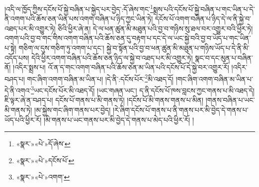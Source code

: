 །འདི་ལ་ཁྱོད་ཀྱིས་དངོས་པོ་སྐྱེ་བཞིན་པ་སྐྱེད་པར་བྱེད་:དོ་ཞེས་གང་\footnote{«སྣར་»«པེ་»དོ་ཞེས་}སྨྲས་པའི་དངོས་པོ་སྐྱེ་བཞིན་པ་གང་ཡིན་པ་དེ་ནི་འགག་པའི་ཆོས་ཅན་ཡིན་པས་འགག་བཞིན་པ་ཉིད་ཀྱང་ཡིན་ཏེ། དངོས་པོ་འགག་བཞིན་པ་ཉིད་དེ་ལ་ནི་སྐྱེ་བ་འཐད་པར་མི་འགྱུར་ཏེ། ཅིའི་ཕྱིར་ཞེ་ན། དེ་ལ་ཕན་ཚུན་མི་མཐུན་པའི་བྱ་བ་གཉིས་སུ་ཐལ་བར་འགྱུར་བའི་ཕྱིར་ཏེ། འགག་པའི་བྱ་བ་གང་གིས་འགག་བཞིན་པའི་ཆོས་ཅན་དུ་བརྟག་པ་དང་དེ་ལ་ཡང་སྐྱེ་བའི་བྱ་བ་ཡོད་པ་གང་ཡིན་པ་སྟེ། གཅིག་ལ་དུས་གཅིག་ཏུ་འགག་པ་དང་། སྐྱེ་བ་སྟོན་པའི་བྱ་བ་ཕན་ཚུན་མི་མཐུན་པ་གཉིས་ཡོད་པ་དེ་ནི་མི་འདོད་པས། དེའི་ཕྱིར་འགག་བཞིན་པའི་ཆོས་ཅན་ཉིད་ལ་སྐྱེ་བ་འཐད་པར་མི་འགྱུར་ཏེ། སྣང་བ་དང་མུན་པ་བཞིན་ནོ། །འདིར་སྨྲས་པ། འོ་ན་ད་གང་འགག་བཞིན་པའི་ཆོས་ཅན་མ་ཡིན་པའི་དངོས་པོ་དེ་སྐྱེ་བར་འགྱུར་རོ། །འདིར་བཤད་པ། གང་ཞིག་འགག་བཞིན་མ་ཡིན་པ། །དེ་ནི་:དངོས་པོར་\footnote{«སྣར་»«པེ་»དངོས་པོ་}མི་འཐད་དོ། །གང་ཞིག་འགག་བཞིན་མ་ཡིན་པ་དེ་ནི་འགའ་\footnote{«སྣར་»«པེ་»འགག་}ཡང་དངོས་པོར་མི་འཐད་དོ། །ཡང་གཞན་ཡང་། ད་ནི་དངོས་པོ་ཁས་བླངས་ཀྱང་གནས་པ་མི་འཐད་དེ། ཇི་ལྟར་ཞེ་ན་བཤད་པ། དངོས་པོ་གནས་པ་མི་གནས་ཏེ། །དངོས་པོ་མི་གནས་གནས་པ་མིན། །གནས་བཞིན་པ་ཡང་མི་གནས་ཏེ། །མ་སྐྱེས་གང་ཞིག་གནས་པར་བྱེད། །རེ་ཞིག་དངོས་པོ་གནས་པ་ནི་གནས་པར་མི་བྱེད་དེ་གནས་པ་ཡོད་པའི་ཕྱིར་རོ། །མི་གནས་པ་ཡང་གནས་པར་མི་བྱེད་དེ་གནས་པ་མེད་པའི་ཕྱིར་རོ། །
